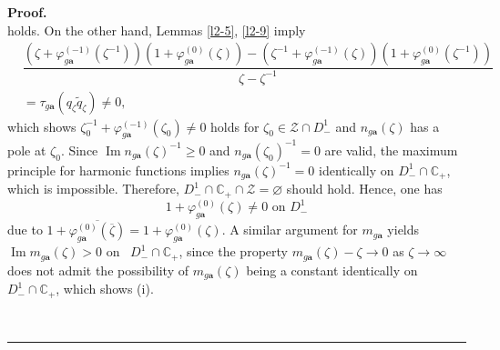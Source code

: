 \documentclass[a4paper]{article}%
\newenvironment{proof}[1][Proof]{\noindent\textbf{#1.} }{\ \rule{0.5em}{0.5em}}
\begin{document}
\begin{proof}
\[\]
holds. On the other hand, Lemmas \ref{l2-5}, \ref{l2-9} imply
\begin{align*}
&  \dfrac{\left(  \zeta+\varphi_{g\boldsymbol{a}}^{\left(  -1\right)  }\left(
\zeta^{-1}\right)  \right)  \left(  1+\varphi_{g\boldsymbol{a}}^{\left(
0\right)  }\left(  \zeta\right)  \right)  -\left(  \zeta^{-1}+\varphi
_{g\boldsymbol{a}}^{\left(  -1\right)  }\left(  \zeta\right)  \right)  \left(
1+\varphi_{g\boldsymbol{a}}^{\left(  0\right)  }\left(  \zeta^{-1}\right)
\right)  }{\zeta-\zeta^{-1}}\\
&  =\tau_{g\boldsymbol{a}}\left(  q_{\zeta}\widetilde{q}_{\zeta}\right)
\neq0\text{,}%
\end{align*}
which shows $\zeta_{0}^{-1}+\varphi_{g\boldsymbol{a}}^{\left(  -1\right)
}(\zeta_{0})\neq0$ holds for $\zeta_{0}\in\mathcal{Z}\cap D_{-}^{1}$ and
$n_{g\boldsymbol{a}}\left(  \zeta\right)  $ has a pole at $\zeta_{0}$. Since
$\operatorname{Im}n_{g\boldsymbol{a}}\left(  \zeta\right)  ^{-1}\geq0$ and
$n_{g\boldsymbol{a}}\left(  \zeta_{0}\right)  ^{-1}=0$ are valid, the maximum
principle for harmonic functions implies $n_{g\boldsymbol{a}}\left(
\zeta\right)  ^{-1}=0$ identically on $D_{-}^{1}\cap\mathbb{C}_{+}$, which is
impossible. Therefore, $D_{-}^{1}\cap\mathbb{C}_{+}\cap\mathcal{Z}%
=\varnothing$ should hold. Hence, one has%
\[
1+\varphi_{g\boldsymbol{a}}^{\left(  0\right)  }\left(  \zeta\right)
\neq0\text{ \ on }D_{-}^{1}%
\]
due to $1+\overline{\varphi_{g\boldsymbol{a}}^{\left(  0\right)  }\left(
\overline{\zeta}\right)  }=1+\varphi_{g\boldsymbol{a}}^{\left(  0\right)
}\left(  \zeta\right)  $. A similar argument for $m_{g\boldsymbol{a}}$ yields
$\operatorname{Im}m_{g\boldsymbol{a}}\left(  \zeta\right)  >0$ on \ $D_{-}%
^{1}\cap\mathbb{C}_{+}$, since the property $m_{g\boldsymbol{a}}\left(
\zeta\right)  -\zeta\rightarrow0$ as $\zeta\rightarrow\infty$ does not admit
the possibility of $m_{g\boldsymbol{a}}\left(  \zeta\right)  $ being a
constant identically on $D_{-}^{1}\cap\mathbb{C}_{+}$, which shows (i).


\end{proof}
\end{document}
